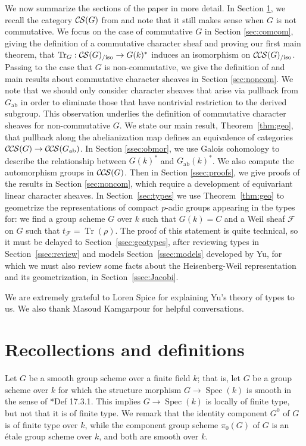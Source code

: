 \documentclass[10pt]{amsart}
\theoremstyle{plain}
\theoremstyle{definition}
\newcommand{\Fq}{k}
\DeclareMathOperator{\trace}{Tr}
\newcommand{\Spec}[1]{{\operatorname{Spec}(#1)}}
\newcommand{\ab}{_{\operatorname{ab}}}
\newcommand{\trFrob}[1]{t_{#1}}
\newcommand{\TrFrob}[1]{\operatorname{Tr}_{#1}}
\newcommand{\cs}[1]{{\mathcal{#1}}}
\newcommand{\CS}{{\mathcal{C\hskip-0.8pt S}}}
\newcommand{\CCS}{{\mathcal{C\hskip-.8pt C\hskip-0.8pt S}}}
\newcommand{\CSiso}[1]{\CS(#1)_{/\text{iso}}}
\newcommand{\CCSiso}[1]{\CCS(#1)_{/\text{iso}}}
\begin{document}
We now summarize the sections of the paper in more detail.
%
In Section \ref{sec:defs}, we recall the category $\CS(G)$ from \cite{cunningham-roe:13a} and note that it still makes sense when $G$ is not commutative.  
%
We focus on the case of commutative $G$ in Section \ref{sec:comcom},
giving the definition of a commutative character sheaf and proving our first main theorem, that
$\TrFrob{G} : \CSiso{G} \to G(k)^*$ induces an isomorphism on $\CCSiso{G}$.
%
Passing to the case that $G$ is non-commutative, we give the definition of and main results about commutative character sheaves in Section \ref{sec:noncom}.  
We note that we should only consider character sheaves that arise via pullback from $G\ab$ in order to eliminate those that have nontrivial restriction to the derived subgroup.  
This observation underlies the definition of commutative character sheaves for non-commutative $G$.  
We state our main result, Theorem~\ref{thm:geo}, that pullback along the abelianization map defines an equivalence of categories $\CCS(G) \to \CCS(G\ab)$.
In Section \ref{ssec:obmor}, we use Galois cohomology to describe the relationship between $G(k)^*$ and $G\ab(k)^*$.  
We also compute the automorphism groups in $\CCS(G)$.
Then in Section \ref{ssec:proofs}, we give proofs of the results in Section \ref{sec:noncom}, which require a development of equivariant linear character sheaves.
%
In Section~\ref{sec:types} we use Theorem~\ref{thm:geo} to geometrize the representations of compact $p$-adic groups appearing in the types for: we find a group scheme $G$ over $\Fq$ such that $G(\Fq) = C$ and a Weil sheaf $\mathcal{F}$ on $G$ such that $\trFrob{\cs{F}} = \trace(\rho)$.
The proof of this statement is quite technical, so it must be delayed to Section~\ref{ssec:geotypes}, after reviewing types in Section~\ref{ssec:review} and models Section~\ref{ssec:models} developed by Yu, for which we must also review some facts about the Heisenberg-Weil representation and its geometrization, in Section~\ref{ssec:Jacobi}.


We are extremely grateful to Loren Spice for explaining Yu's theory of types to us.
We also thank Masoud Kamgarpour for helpful conversations.

\section{Recollections and definitions} \label{sec:defs}

Let $G$ be a smooth group scheme over a finite field $\Fq$; that is, let $G$ be a group scheme over $\Fq$
for which the structure morphism $G \to \Spec{\Fq}$ is smooth in the sense of \cite{EGAIV4}*{Def 17.3.1}.
This implies $G \to \Spec{\Fq}$ is locally of finite type, but not that it is of finite type.
We remark that the identity component $G^0$ of $G$ is of finite type over $\Fq$, while the component group scheme
$\pi_0(G)$ of $G$ is an \'etale group scheme over $\Fq$, and both are smooth over $\Fq$.
\end{document}
